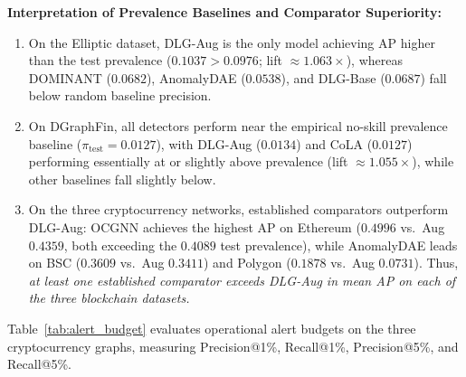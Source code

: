 \documentclass[applsci,article,submit,moreauthors,pdftex]{Definitions/mdpi}
\begin{document}
\textbf{Interpretation of Prevalence Baselines and Comparator Superiority:}
\begin{enumerate}
    \item On the Elliptic dataset, DLG-Aug is the only model achieving AP higher than the test prevalence ($0.1037 > 0.0976$; lift $\approx 1.063\times$), whereas DOMINANT ($0.0682$), AnomalyDAE ($0.0538$), and DLG-Base ($0.0687$) fall below random baseline precision.
    \item On DGraphFin, all detectors perform near the empirical no-skill prevalence baseline ($\pi_{\mathrm{test}} = 0.0127$), with DLG-Aug ($0.0134$) and CoLA ($0.0127$) performing essentially at or slightly above prevalence (lift $\approx 1.055\times$), while other baselines fall slightly below.
    \item On the three cryptocurrency networks, established comparators outperform DLG-Aug: OCGNN achieves the highest AP on Ethereum ($0.4996$ vs.\ Aug $0.4359$, both exceeding the $0.4089$ test prevalence), while AnomalyDAE leads on BSC ($0.3609$ vs.\ Aug $0.3411$) and Polygon ($0.1878$ vs.\ Aug $0.0731$). Thus, \textit{at least one established comparator exceeds DLG-Aug in mean AP on each of the three blockchain datasets.}
\end{enumerate}

Table~\ref{tab:alert_budget} evaluates operational alert budgets on the three cryptocurrency graphs, measuring Precision@1\%, Recall@1\%, Precision@5\%, and Recall@5\%.
\end{document}

